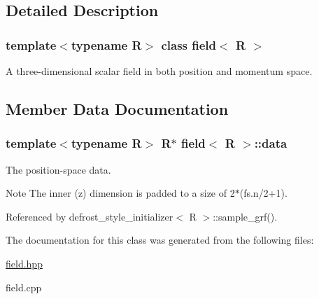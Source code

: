 \subsection{Detailed Description}
\subsubsection*{template$<$typename R$>$ class field$<$ R $>$}

A three-\/dimensional scalar field in both position and momentum space. 

\subsection{Member Data Documentation}
\hypertarget{classfield_a5c465fa5d00104c5bbb683a6574a4057}{
\subsubsection[{data}]{\setlength{\rightskip}{0pt plus 5cm}template$<$typename R$>$ R$\ast$ {\bf field}$<$ R $>$::{\bf data}}}
\label{classfield_a5c465fa5d00104c5bbb683a6574a4057}


The position-\/space data. 

\begin{DoxyNote}{Note}
The inner (z) dimension is padded to a size of 2$\ast$(fs.n/2+1). 
\end{DoxyNote}


Referenced by defrost\_\-style\_\-initializer$<$ R $>$::sample\_\-grf().



The documentation for this class was generated from the following files:\begin{DoxyCompactItemize}
\item 
\hyperlink{field_8hpp}{field.hpp}\item 
field.cpp\end{DoxyCompactItemize}
